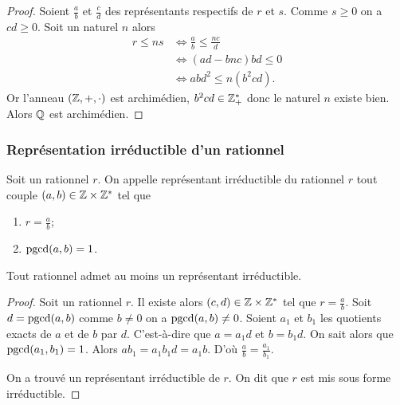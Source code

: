 \begin{proof}
  Soient $\frac{a}{b}$ et $\frac{c}{d}$ des représentants respectifs de $r$ et $s$. Comme $s \geqslant 0$ on a $cd \geqslant 0$. Soit un naturel $n$ alors
  \begin{align}
    r \leqslant ns &\iff \frac{a}{b} \leqslant \frac{nc}{d} \\
    &\iff (ad-bnc)bd \leqslant 0 \\
    &\iff abd^2 \leqslant n(b^2cd).
  \end{align}
  Or l'anneau $(\mathbb{Z},+,\cdot)$ est archimédien, $b^2cd \in \mathbb{Z}^*_+$ donc le naturel $n$ existe bien. Alors $\mathbb{Q}$ est archimédien.
\end{proof}

\subsubsection{Représentation irréductible d'un rationnel}

\begin{defdef}
  Soit un rationnel $r$. On appelle représentant irréductible du rationnel $r$ tout couple $(a,b) \in \mathbb{Z} \times \mathbb{Z}^*$ tel que
  \begin{enumerate}
  \item $r=\frac{a}{b}$;
  \item $\operatorname{pgcd}(a,b)=1$.
  \end{enumerate}
\end{defdef}
\begin{theo}
  Tout rationnel admet au moins un représentant irréductible.
\end{theo}
\begin{proof}
  Soit un rationnel $r$. Il existe alors $(c,d) \in \mathbb{Z} \times \mathbb{Z}^*$ tel que $r = \frac{a}{b}$. Soit $d= \operatorname{pgcd}(a,b)$ comme $b \neq 0$ on a $\operatorname{pgcd}(a,b) \neq 0$. Soient $a_1$ et $b_1$ les quotients exacts de $a$ et de $b$ par $d$. C'est-à-dire que $a=a_1d$ et $b=b_1d$. On sait alors que $\operatorname{pgcd}(a_1,b_1)=1$. Alors $ab_1=a_1b_1d=a_1b$. D'où $\frac{a}{b}=\frac{a_1}{b_1}$.

On a trouvé un représentant irréductible de $r$. On dit que $r$ est mis sous forme irréductible.
\end{proof}

